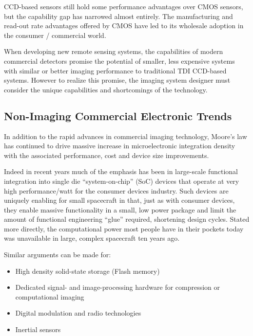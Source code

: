 \documentclass[]{spieman}  %
\begin{document}

CCD-based sensors still hold some performance advantages over CMOS sensors, but the capability gap has narrowed almost entirely. The manufacturing and read-out rate advantages offered by CMOS have led to its wholesale adoption in the consumer / commercial world.

When developing new remote sensing systems, the capabilities of modern commercial detectors promise the potential of smaller, less expensive systems with similar or better imaging performance to traditional TDI CCD-based systems.  However to realize this promise, the imaging system designer must consider the unique capabilities and shortcomings of the technology.

\subsection{Non-Imaging Commercial Electronic Trends}

In addition to the rapid advances in commercial imaging technology, Moore's law has continued to drive massive increase in microelectronic integration density with the associated performance, cost and device size improvements.

Indeed in recent years much of the emphasis has been in large-scale functional integration into single die ``system-on-chip'' (SoC) devices that operate at very high performance/watt for the consumer devices industry.  Such devices are uniquely enabling for small spacecraft in that, just as with consumer devices, they enable massive functionality in a small, low power package and limit the amount of functional engineering ``glue'' required, shortening design cycles.  Stated more directly, the computational power most people have in their pockets today was unavailable in large, complex spacecraft ten years ago.

Similar arguments can be made for:

\begin{itemize}
    \item High density solid-state storage (Flash memory)
    \item Dedicated signal- and image-processing hardware for compression or computational imaging
    \item Digital modulation and radio technologies
    \item Inertial sensors
\end{itemize}
\end{document}
